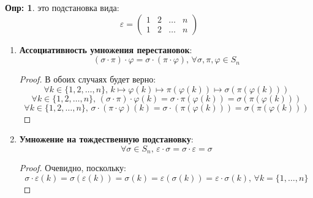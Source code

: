 \documentclass[12pt]{article}
\newcommand{\VE}{\varepsilon}
\theoremstyle{definition}
\newtheorem{defn}{Опр:}
\begin{document}
\begin{defn}
	 это подстановка вида:
	$$
		\VE = 
		\begin{pmatrix}
			1 & 2 & \dotsc & n\\
			1 & 2 & \dotsc & n
		\end{pmatrix}
	$$
\end{defn}
\begin{enumerate}[label=\arabic*)]
	\item\textbf{ Ассоциативность умножения перестановок}:
	$$
		(\sigma{\cdot}\pi){\cdot}\varphi = \sigma{\cdot}(\pi{\cdot}\varphi), \, \forall \sigma, \pi, \varphi \in S_n
	$$
	\begin{proof}
		В обоих случаях будет верно:
		$$
			\forall k \in \{1,2, \dotsc, n\}, \, k \mapsto \varphi(k) \mapsto \pi(\varphi(k)) \mapsto \sigma(\pi(\varphi(k)))
		$$
		$$
			\forall k \in \{1,2, \dotsc, n\}, \, (\sigma{\cdot}\pi){\cdot}\varphi(k) = \sigma{\cdot}\pi(\varphi(k)) = \sigma(\pi(\varphi(k)))
		$$
		$$
			\forall k \in \{1,2, \dotsc, n\}, \, \sigma{\cdot}(\pi{\cdot}\varphi)(k) = \sigma{\cdot}(\pi(\varphi(k))) = \sigma(\pi(\varphi(k)))
		$$
	\end{proof}
	
	\item \textbf{Умножение на тождественную подстановку}:
	$$
		\forall \sigma \in S_n, \, \VE{\cdot}\sigma = \sigma{\cdot}\VE = \sigma
	$$
	\begin{proof}
		Очевидно, поскольку: 
		$$
			\sigma{\cdot}\VE(k) = \sigma(\VE(k)) = \sigma(k) = \VE(\sigma(k))= \VE{\cdot}\sigma(k), \, \forall k = \{1,\dotsc, n\}
		$$
	\end{proof}
	

\end{enumerate}
\end{document}

